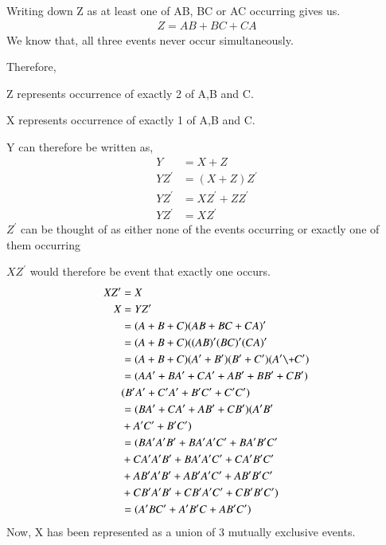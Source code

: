\documentclass[journal,12pt,twocolumn]{IEEEtran}
\begin{document}
\begin{enumerate}[label=(\alph*)]
Writing down Z as at least one of AB, BC or AC occurring gives us.
\begin{align}
    Z=AB+BC+CA
\end{align}
We know that, all three events never occur simultaneously.

Therefore,

Z represents occurrence of exactly 2 of A,B and C.

X represents occurrence of exactly 1 of A,B and C.

Y can therefore be written as,
\begin{align}
    Y&=X+Z\\
    YZ^\prime&=(X+Z)Z^\prime\\
    YZ^\prime&=XZ^\prime+ZZ^\prime\\
    YZ^\prime&=XZ^\prime
\end{align}
$Z^\prime$ can be thought of as either none of the events occurring or exactly one of them occurring

$XZ^\prime$ would therefore be event that exactly one occurs.
\begin{align}
    XZ^\prime&=X\\
    X&=YZ^\prime\\
    &=(A+B+C)(AB+BC+CA)^\prime\\
    &=(A+B+C)((AB)^\prime(BC)^\prime(CA)^\prime\\
    &=(A+B+C)(A^\prime+B^\prime)(B^\prime+C^\prime)(A^\prime\+C^\prime)\\
    &=(AA^\prime+BA^\prime+CA^\prime+AB^\prime+BB^\prime+CB^\prime)\nonumber\\&(B^\prime A^\prime+C^\prime A^\prime+B^\prime C^\prime +C^\prime C^\prime)\\
    &=(BA^\prime+CA^\prime+AB^\prime+CB^\prime)(A^\prime B^\prime\nonumber\\&+A^\prime C^\prime+B^\prime C^\prime)\\
    &=(BA^\prime A^\prime B^\prime+BA^\prime A^\prime C^\prime+BA^\prime B^\prime C^\prime\nonumber\\
    &+CA^\prime A^\prime B^\prime +BA^\prime A^\prime C^\prime+CA^\prime B^\prime C^\prime\nonumber\\
    &+AB^\prime A^\prime B^\prime+ AB^\prime A^\prime C^\prime+AB^\prime B^\prime C^\prime\\
    &+CB^\prime A^\prime B^\prime+ CB^\prime A^\prime C^\prime +CB^\prime B^\prime C^\prime)\\
    &=(A^\prime BC^\prime+A^\prime B^\prime C+AB^\prime C^\prime)
\end{align}
Now, X has been represented as a union of 3 mutually exclusive events.


\end{enumerate}
\end{document}
